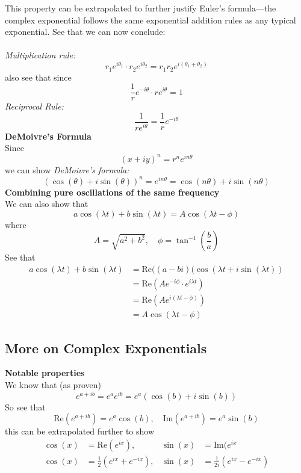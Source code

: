 \documentclass{report}
\begin{document}
This property can be extrapolated to further justify Euler's formula---the complex exponential follows
the same exponential addition rules as any typical exponential. See that we can now conclude:\\
\vspace{1mm}\\
\textit{Multiplication rule:}
\begin{equation*}
r_1e^{i\theta_1}\cdot r_2e^{i\theta_2}=r_1r_2e^{i(\theta_1+\theta_2)}
\end{equation*}
also see that since
\begin{equation*}
\frac{1}{r}e^{-i\theta}\cdot re^{i\theta}=1
\end{equation*}
\textit{Reciprocal Rule:} 
\begin{equation*}
\frac{1}{re^{i\theta}}=\frac{1}{r}e^{-i\theta}
\end{equation*}
\textbf{DeMoivre's Formula}\\
Since 
\begin{equation*}
(x+iy)^n=r^ne^{in\theta}
\end{equation*}
we can show \textit{DeMoivre's formula:}
\begin{equation*}
(\cos(\theta)+i\sin(\theta))^n=e^{in\theta}=\cos(n\theta)+i\sin(n\theta)
\end{equation*}
\textbf{Combining pure oscillations of the same frequency}\\
We can also show that
\begin{equation*}
a\cos(\lambda t)+b\sin(\lambda t)=A\cos(\lambda t-\phi)
\end{equation*}
where
\begin{equation*}
A=\sqrt{a^2+b^2},\quad\phi=\tan^{-1}\left(\frac{b}{a}\right)
\end{equation*}
See that
\begin{align*}
a\cos(\lambda t)+b\sin(\lambda t)&=\text{Re}((a-bi)(\cos(\lambda t+i\sin(\lambda t))\\
&=\text{Re}(Ae^{-i\phi}\cdot e^{i\lambda t})\\
&=\text{Re}(Ae^{i(\lambda t-\phi)})\\
&=A\cos(\lambda t-\phi)
\end{align*}
\newpage

\subsection{More on Complex Exponentials}%
\textbf{Notable properties}\\
We know that (as proven)
\begin{equation*}
e^{a+ib}=e^ae^{ib}=e^a(\cos(b)+i\sin(b))
\end{equation*}
So see that
\begin{equation*}
\text{Re}(e^{a+ib})=e^a\cos(b),\quad
\text{Im}(e^{a+ib})=e^a\sin(b)
\end{equation*}
this can be extrapolated further to show
\begin{align*}
\cos(x)&=\text{Re}(e^{ix}),&\sin(x)&=\text{Im}(e^{ix}\\
\cos(x)&=\frac{1}{2}(e^{ix}+e^{-ix}),&\sin(x)&=
\frac{1}{2i}(e^{ix}-e^{-ix})
\end{align*}
\end{document}
